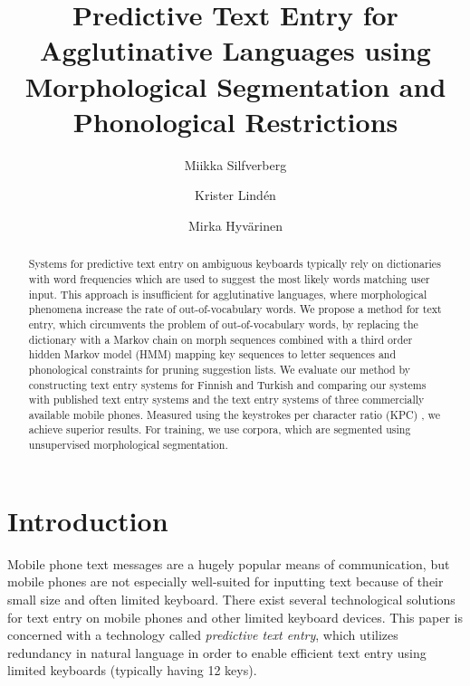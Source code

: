 \documentclass{llncs}
\begin{document}
\title{Predictive Text Entry for Agglutinative Languages using Morphological Segmentation and Phonological Restrictions}

\author{Miikka Silfverberg \and Krister Lindén \and Mirka Hyvärinen}

\maketitle

\begin{abstract}
Systems for predictive text entry on ambiguous keyboards typically
rely on dictionaries with word frequencies which are used to suggest
the most likely words matching user input. This approach is
insufficient for agglutinative languages, where morphological
phenomena increase the rate of out-of-vocabulary words. We propose a
method for text entry, which circumvents the problem of
out-of-vocabulary words, by replacing the dictionary with a Markov
chain on morph sequences combined with a third order hidden Markov
model (HMM) mapping key sequences to letter sequences and phonological
constraints for pruning suggestion lists. We evaluate our method by
constructing text entry systems for Finnish and Turkish and comparing
our systems with published text entry systems and the text entry systems
of three commercially available mobile phones. Measured using the
keystrokes per character ratio (KPC) \cite{MacKenzie02kspc}, we
achieve superior results. For training, we use corpora, which are
segmented using unsupervised morphological segmentation.
\end{abstract}

\section{Introduction}

Mobile phone text messages are a hugely popular means of
communication, but mobile phones are not especially well-suited for
inputting text because of their small size and often limited
keyboard. There exist several technological solutions for text entry
on mobile phones and other limited keyboard devices. This paper is
concerned with a technology called \textit{predictive text entry}, which
utilizes redundancy in natural language in order to enable efficient
text entry using limited keyboards (typically having 12 keys).
\end{document}
